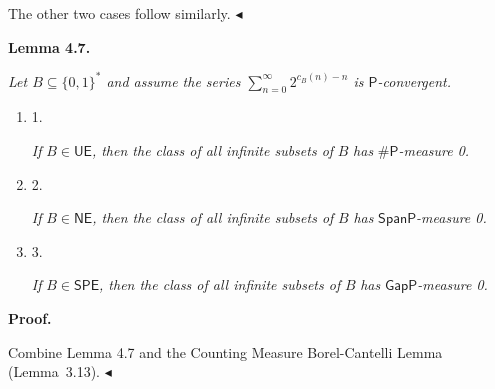 \documentclass[10pt,a4paper]{article}
\begin{document}
The other two cases follow similarly.
$\blacktriangleleft$\par





\par\medskip\noindent\textbf{
\textbf{Lemma 4.7}\textbf{.}
}\par



\emph{Let $B\subseteq\{0,1\}^{*}$ and assume the series $\sum\limits_{n=0}^{\infty}2^{c_{B}(n)-n}$ is $\mathsf{P}$-convergent.}\par


\begin{enumerate}


\item[] 
1. 


\emph{If }$B\in\mathsf{UE}$\emph{, then
the class of all infinite subsets of }$B$\emph{ has }${\mathsf{\#}\mathsf{P}}$\emph{-measure 0.}\par





\item[] 
2. 


\emph{If }$B\in\mathsf{NE}$\emph{, then
the class of all infinite subsets of }$B$\emph{ has }$\mathsf{SpanP}$\emph{-measure 0.}\par





\item[] 
3. 


\emph{If }$B\in\mathsf{SPE}$\emph{, then
the class of all infinite subsets of }$B$\emph{ has }$\mathsf{GapP}$\emph{-measure 0.}\par





\end{enumerate}







\par\medskip\noindent\textbf{Proof.}\par




Combine Lemma 4.7 and the Counting Measure Borel-Cantelli Lemma (Lemma 3.13).
$\blacktriangleleft$\par
\end{document}
